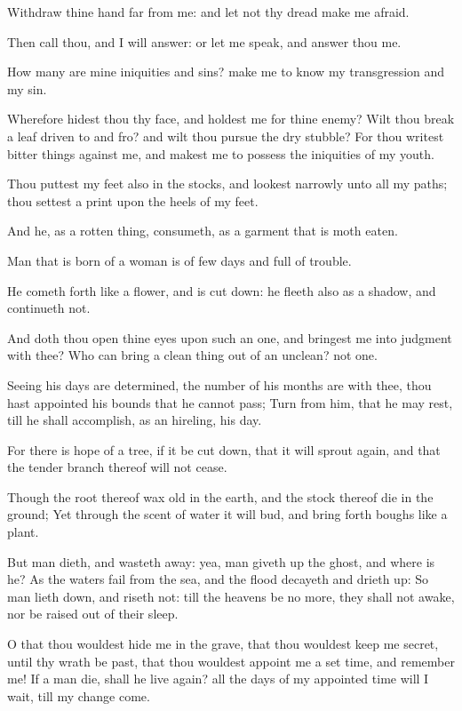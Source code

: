 \Verse Withdraw thine hand far from me: and let not thy dread make me afraid.

\Verse Then call thou, and I will answer: or let me speak, and answer thou me.

\Verse How many are mine iniquities and sins? make me to know my transgression and my sin.

\Verse Wherefore hidest thou thy face, and holdest me for thine enemy?  \Verse Wilt thou break a leaf driven to and fro? and wilt thou pursue the dry stubble?  \Verse For thou writest bitter things against me, and makest me to possess the iniquities of my youth.

\Verse Thou puttest my feet also in the stocks, and lookest narrowly unto all my paths; thou settest a print upon the heels of my feet.

\Verse And he, as a rotten thing, consumeth, as a garment that is moth eaten.


\Chapter
\Verse Man that is born of a woman is of few days and full of trouble.

\Verse He cometh forth like a flower, and is cut down: he fleeth also as a shadow, and continueth not.

\Verse And doth thou open thine eyes upon such an one, and bringest me into judgment with thee?  \Verse Who can bring a clean thing out of an unclean? not one.

\Verse Seeing his days are determined, the number of his months are with thee, thou hast appointed his bounds that he cannot pass; \Verse Turn from him, that he may rest, till he shall accomplish, as an hireling, his day.

\Verse For there is hope of a tree, if it be cut down, that it will sprout again, and that the tender branch thereof will not cease.

\Verse Though the root thereof wax old in the earth, and the stock thereof die in the ground; \Verse Yet through the scent of water it will bud, and bring forth boughs like a plant.

\Verse But man dieth, and wasteth away: yea, man giveth up the ghost, and where is he?  \Verse As the waters fail from the sea, and the flood decayeth and drieth up: \Verse So man lieth down, and riseth not: till the heavens be no more, they shall not awake, nor be raised out of their sleep.

\Verse O that thou wouldest hide me in the grave, that thou wouldest keep me secret, until thy wrath be past, that thou wouldest appoint me a set time, and remember me!  \Verse If a man die, shall he live again?  all the days of my appointed time will I wait, till my change come.

